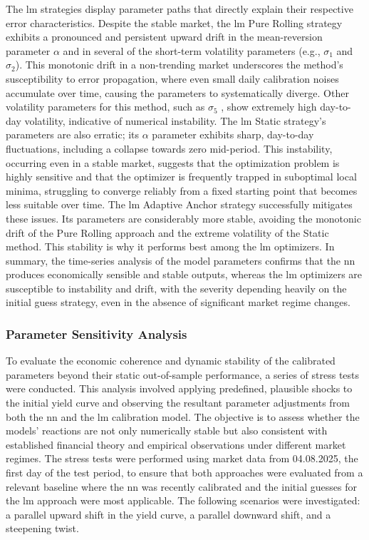 The \ac{lm} strategies display parameter paths that directly explain their respective error characteristics. Despite the stable market, the \ac{lm} Pure Rolling strategy exhibits a pronounced and persistent upward drift in the mean-reversion parameter $\alpha$ and in several of the short-term volatility parameters (e.g., $\sigma_1$ and $\sigma_2$). This monotonic drift in a non-trending market underscores the method's susceptibility to error propagation, where even small daily calibration noises accumulate over time, causing the parameters to systematically diverge. Other volatility parameters for this method, such as $\sigma_5$
, show extremely high day-to-day volatility, indicative of numerical instability. The \ac{lm} Static strategy's parameters are also erratic; its $\alpha$ parameter exhibits sharp, day-to-day fluctuations, including a collapse towards zero mid-period. This instability, occurring even in a stable market, suggests that the optimization problem is highly sensitive and that the optimizer is frequently trapped in suboptimal local minima, struggling to converge reliably from a fixed starting point that becomes less suitable over time. The \ac{lm} Adaptive Anchor strategy successfully mitigates these issues. Its parameters are considerably more stable, avoiding the monotonic drift of the Pure Rolling approach and the extreme volatility of the Static method. This stability is why it performs best among the \ac{lm} optimizers. In summary, the time-series analysis of the model parameters confirms that the \ac{nn} produces economically sensible and stable outputs, whereas the \ac{lm} optimizers are susceptible to instability and drift, with the severity depending heavily on the initial guess strategy, even in the absence of significant market regime changes.

\subsubsection{Parameter Sensitivity Analysis}
To evaluate the economic coherence and dynamic stability of the calibrated parameters beyond their static out-of-sample performance, a series of stress tests were conducted. This analysis involved applying predefined, plausible shocks to the initial yield curve and observing the resultant parameter adjustments from both the \ac{nn} and the \ac{lm} calibration model. The objective is to assess whether the models' reactions are not only numerically stable but also consistent with established financial theory and empirical observations under different market regimes. The stress tests were performed using market data from 04.08.2025, the first day of the test period, to ensure that both approaches were evaluated from a relevant baseline where the \ac{nn} was recently calibrated and the initial guesses for the \ac{lm} approach were most applicable. The following scenarios were investigated: a parallel upward shift in the yield curve, a parallel downward shift, and a steepening twist.

